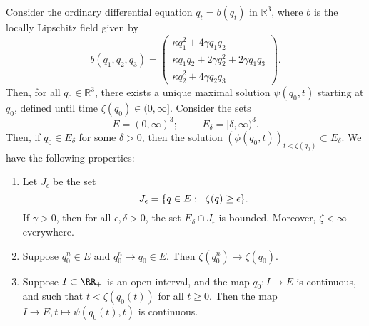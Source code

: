 \begin{lemma}\label{lemma: ODE considerations} Consider the ordinary differential equation $\dot{q}_t=b(q_t)$ in $\mathbb{R}^3$, where $b$ is the locally Lipschitz field given by \begin{equation} \label{eq: system of ODEs} b(q_1,q_2,q_3)=\begin{pmatrix}\kappa q_1^2+4\gamma q_1q_2 \\ \kappa q_1q_2+2\gamma q_2^2+2\gamma q_1q_3 \\ \kappa q_2^2 + 4\gamma q_2q_3 \end{pmatrix}. \end{equation} Then, for all $q_0\in \mathbb{R}^3$, there exists a unique maximal solution $\psi(q_0, t)$ starting at $q_0$, defined until time $\zeta(q_0)\in (0, \infty]$. Consider the sets \begin{equation} E=(0, \infty)^3; \hspace{1cm} E_\delta=[\delta,\infty)^3.\end{equation} Then, if $q_0 \in E_\delta$ for some $\delta>0$, then the solution $(\phi(q_0,t))_{t<\zeta(q_0)} \subset E_\delta$. We have the following properties: \begin{enumerate}[label=\roman{*}).] \item Let $J_\epsilon$ be the set \begin{equation} J_\epsilon  =\{q \in E: \hspace{0.2cm} \zeta(q)\ge\epsilon\}.\end{equation} If $\gamma>0$, then for all $\epsilon, \delta>0$, the set $E_\delta \cap J_\epsilon $ is bounded. Moreover, $\zeta<\infty$ everywhere. \item Suppose $q^n_0 \in E$ and $q^n_0 \rightarrow q_0 \in E$. Then $\zeta(q^n_0)\rightarrow \zeta(q_0).$ \item Suppose $I\subset \RR_+$ is an open interval, and the map $q_0: I\rightarrow E$ is continuous, and such that $t<\zeta(q_0(t))$ for all $t\ge 0.$ Then the map $I\rightarrow E, t\mapsto \psi(q_0(t), t)$ is continuous. 
 \end{enumerate} \end{lemma} 

